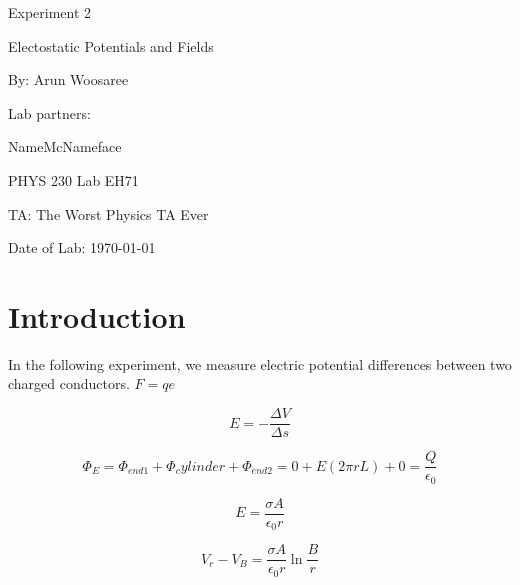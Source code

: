 \documentclass[letterpaper]{article}
\begin{document}
  \begin{titlepage}
    \begin{center}
        \vspace*{1cm}
        \Huge
        Experiment 2
        \vspace{1cm}

        Electostatic Potentials and Fields
        \vspace{1cm}

        By: Arun Woosaree
        \vspace{1cm}

        Lab partners:

        \vspace{1cm}
        \Large
        NameMcNameface
        \vspace{1cm}

        \Huge
        PHYS 230 Lab EH71
        \vspace{1cm}

        TA: The Worst Physics TA Ever
        \vspace{1cm}

        Date of Lab: \today
        \vfill
    \end{center}
\end{titlepage}

\section{Introduction}
In the following experiment, we measure electric potential differences between
two charged conductors. $ F=qe$

\begin{equation}
  E=-\frac{\Delta V}{\Delta s}
\end{equation}

\begin{equation}
  \Phi_E = \Phi_{end1} + \Phi_cylinder + \Phi_{end2} = 0+E(2\pi rL) + 0 =\frac{Q}{\epsilon_0}
\end{equation}

\begin{equation}
  E=\frac{\sigma A}{\epsilon_0 r}
\end{equation}

\begin{equation}
  V_r-V_B=\frac{\sigma A}{\epsilon_0 r} \ln{\frac{B}{r}}
\end{equation}
\end{document}
